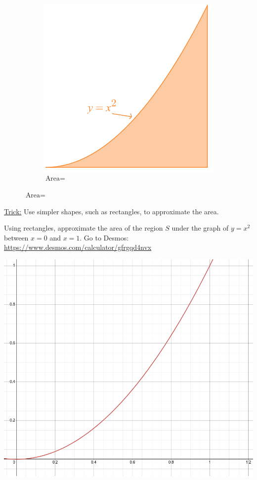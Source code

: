 \documentclass[12pt,a4paper]{article}
\newcounter{example}[section]
\begin{document}
\begin{figure}[ht]
\begin{subfigure}[b]{0.32\textwidth}
			\includegraphics[scale=0.25]{parabola.png}
			\caption{$\text{Area} = $ \phantom{AAAAA}}
		\end{subfigure}
	\end{figure}
	
	\vspace*{12pt}
	
	\underline{Trick:} Use simpler shapes, such as rectangles, to approximate the area.
	
	\vspace*{12pt}
	
	\begin{example}\label{Ex:ParabolaArea}
	Using rectangles, approximate the area of the region $S$ under the graph of $y= x^2$ between $x = 0$ and $x = 1$. Go to Desmos: \url{https://www.desmos.com/calculator/gfrgqd4nvx}
	\end{example}
	
	\includegraphics[scale=0.25]{graphOfSquareX.png}
	
\end{document}

